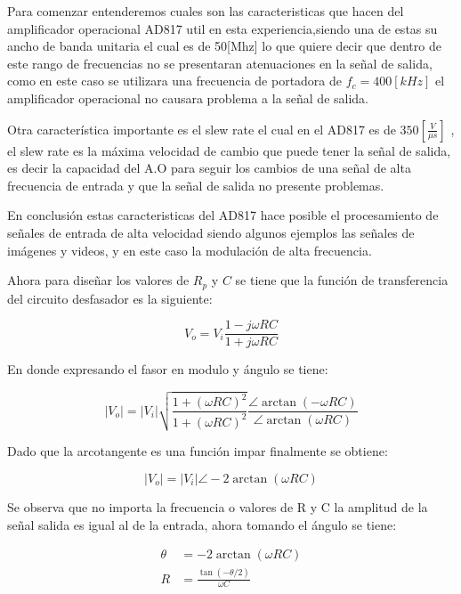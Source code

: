 \documentclass[letterpaper, titlepage]{article}
\providecommand{\abs}[1]{\lvert#1\rvert}
\begin{document}
	
		Para comenzar entenderemos cuales son las caracteristicas que hacen del amplificador operacional AD817 util en esta experiencia,siendo una de estas su ancho de banda unitaria el cual es de 50[Mhz] lo que quiere decir que dentro de este rango de frecuencias no se presentaran atenuaciones en la señal de salida, como en este caso se utilizara una frecuencia de portadora de $f_{c} = 400[kHz]$ el amplificador operacional no causara problema a la señal de salida.

		Otra característica importante es el slew rate el cual en el AD817 es de $350[\frac{V}{\mu s}]$ , el slew rate es la máxima velocidad de cambio que puede tener la señal de salida, es decir la capacidad del A.O para seguir los cambios de una señal de alta frecuencia de entrada y que la señal de salida no presente problemas.

		En conclusión estas caracteristicas del AD817 hace posible el procesamiento de señales de entrada de alta velocidad siendo algunos ejemplos las señales de imágenes y videos, y en este caso la modulación de alta frecuencia.

		Ahora para diseñar los valores de $ R_{p} $ y $C$ se tiene que la función de transferencia  del circuito desfasador es la siguiente:

		\begin{equation}
			V_{o} = V_{i} \frac{1- j \omega R C}{1 + j \omega R C}
		\end{equation}
	
		En donde expresando el fasor en modulo y ángulo se tiene:

		\begin{equation*}
			\abs{V_{o}}  = \abs{V_{i}} \sqrt{\frac{1 +( \omega R C)^2}{1 +( \omega R C)^2}} \frac{\angle \arctan(- \omega R C ) }{\angle \arctan(\omega R C )}
		\end{equation*}

		\newpage

		Dado que la arcotangente es una función impar finalmente se obtiene:

		\begin{equation}
			\abs{V_{o}}  = \abs{V_{i}} \angle -2 \arctan (\omega R C)
		\end{equation}
	
		Se observa que no importa la frecuencia o valores de R y C la amplitud de la señal salida es igual al de la entrada, ahora tomando el ángulo se tiene:	

		\begin{align*}
			\theta & = -2 \arctan (\omega R C) \\
			R & = \frac{\tan( -\theta/2)}{ \omega C }\\
		\end{align*}
\end{document}
